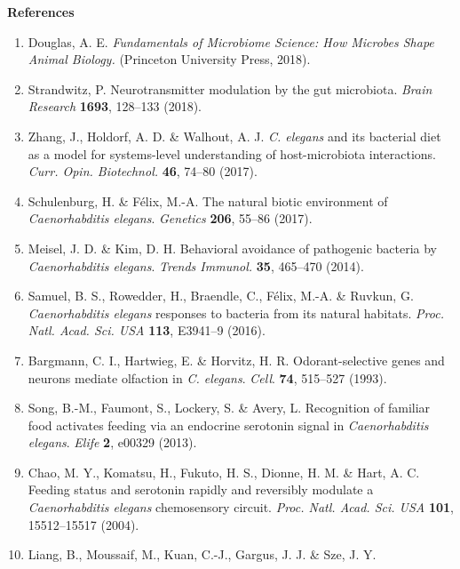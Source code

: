 \documentclass[11pt,]{article}
\providecommand{\tightlist}{%
  \setlength{\itemsep}{0pt}\setlength{\parskip}{0pt}}
\begin{document}
\vspace{2\parsep}

\begin{center}
\textbf{References}
\end{center}

\noindent

\begin{enumerate}
\def\labelenumi{\arabic{enumi}.}
\tightlist
\item
  Douglas, A. E. \emph{Fundamentals of Microbiome Science: How Microbes
  Shape Animal Biology.} (Princeton University Press, 2018).
\item
  Strandwitz, P. Neurotransmitter modulation by the gut microbiota.
  \emph{Brain Research} \textbf{1693}, 128--133 (2018).
\item
  Zhang, J., Holdorf, A. D. \& Walhout, A. J. \emph{C. elegans} and its
  bacterial diet as a model for systems-level understanding of
  host-microbiota interactions. \emph{Curr. Opin. Biotechnol.}
  \textbf{46}, 74--80 (2017).
\item
  Schulenburg, H. \& Félix, M.-A. The natural biotic environment of
  \emph{Caenorhabditis elegans}. \emph{Genetics} \textbf{206}, 55--86
  (2017).
\item
  Meisel, J. D. \& Kim, D. H. Behavioral avoidance of pathogenic
  bacteria by \emph{Caenorhabditis elegans}. \emph{Trends Immunol.}
  \textbf{35}, 465--470 (2014).
\item
  Samuel, B. S., Rowedder, H., Braendle, C., Félix, M.-A. \& Ruvkun, G.
  \emph{Caenorhabditis elegans} responses to bacteria from its natural
  habitats. \emph{Proc. Natl. Acad. Sci. USA} \textbf{113}, E3941--9
  (2016).
\item
  Bargmann, C. I., Hartwieg, E. \& Horvitz, H. R. Odorant-selective
  genes and neurons mediate olfaction in \emph{C. elegans}. \emph{Cell}.
  \textbf{74}, 515--527 (1993).
\item
  Song, B.-M., Faumont, S., Lockery, S. \& Avery, L. Recognition of
  familiar food activates feeding via an endocrine serotonin signal in
  \emph{Caenorhabditis elegans}. \emph{Elife} \textbf{2}, e00329 (2013).
\item
  Chao, M. Y., Komatsu, H., Fukuto, H. S., Dionne, H. M. \& Hart, A. C.
  Feeding status and serotonin rapidly and reversibly modulate a
  \emph{Caenorhabditis elegans} chemosensory circuit. \emph{Proc. Natl.
  Acad. Sci. USA} \textbf{101}, 15512--15517 (2004).
\item
  Liang, B., Moussaif, M., Kuan, C.-J., Gargus, J. J. \& Sze, J. Y.

\end{enumerate}
\end{document}
